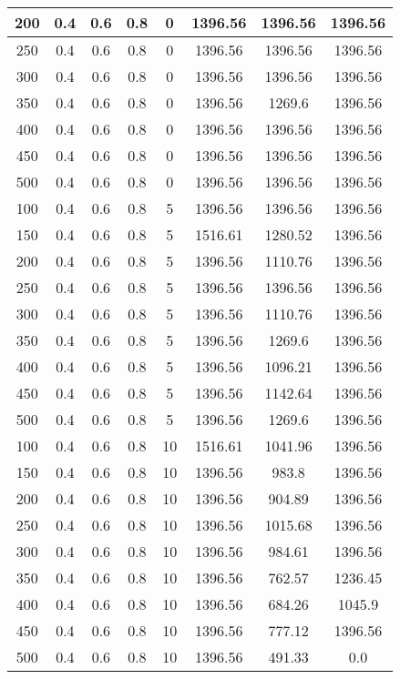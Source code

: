 \documentclass[a4paper, 12pt]{extreport}
\begin{document}
\begin{itemize}
\begin{longtable}{|c|c|c|c|c|c|c|c|}
			200 & 0.4 & 0.6 & 0.8 & 0 & 1396.56 & 1396.56 & 1396.56 \\\hline
			250 & 0.4 & 0.6 & 0.8 & 0 & 1396.56 & 1396.56 & 1396.56 \\\hline
			300 & 0.4 & 0.6 & 0.8 & 0 & 1396.56 & 1396.56 & 1396.56 \\\hline
			350 & 0.4 & 0.6 & 0.8 & 0 & 1396.56 & 1269.6 & 1396.56 \\\hline
			400 & 0.4 & 0.6 & 0.8 & 0 & 1396.56 & 1396.56 & 1396.56 \\\hline
			450 & 0.4 & 0.6 & 0.8 & 0 & 1396.56 & 1396.56 & 1396.56 \\\hline
			500 & 0.4 & 0.6 & 0.8 & 0 & 1396.56 & 1396.56 & 1396.56 \\\hline
			100 & 0.4 & 0.6 & 0.8 & 5 & 1396.56 & 1396.56 & 1396.56 \\\hline
			150 & 0.4 & 0.6 & 0.8 & 5 & 1516.61 & 1280.52 & 1396.56 \\\hline
			200 & 0.4 & 0.6 & 0.8 & 5 & 1396.56 & 1110.76 & 1396.56 \\\hline
			250 & 0.4 & 0.6 & 0.8 & 5 & 1396.56 & 1396.56 & 1396.56 \\\hline
			300 & 0.4 & 0.6 & 0.8 & 5 & 1396.56 & 1110.76 & 1396.56 \\\hline
			350 & 0.4 & 0.6 & 0.8 & 5 & 1396.56 & 1269.6 & 1396.56 \\\hline
			400 & 0.4 & 0.6 & 0.8 & 5 & 1396.56 & 1096.21 & 1396.56 \\\hline
			450 & 0.4 & 0.6 & 0.8 & 5 & 1396.56 & 1142.64 & 1396.56 \\\hline
			500 & 0.4 & 0.6 & 0.8 & 5 & 1396.56 & 1269.6 & 1396.56 \\\hline
			100 & 0.4 & 0.6 & 0.8 & 10 & 1516.61 & 1041.96 & 1396.56 \\\hline
			150 & 0.4 & 0.6 & 0.8 & 10 & 1396.56 & 983.8 & 1396.56 \\\hline
			200 & 0.4 & 0.6 & 0.8 & 10 & 1396.56 & 904.89 & 1396.56 \\\hline
			250 & 0.4 & 0.6 & 0.8 & 10 & 1396.56 & 1015.68 & 1396.56 \\\hline
			300 & 0.4 & 0.6 & 0.8 & 10 & 1396.56 & 984.61 & 1396.56 \\\hline
			350 & 0.4 & 0.6 & 0.8 & 10 & 1396.56 & 762.57 & 1236.45 \\\hline
			400 & 0.4 & 0.6 & 0.8 & 10 & 1396.56 & 684.26 & 1045.9 \\\hline
			450 & 0.4 & 0.6 & 0.8 & 10 & 1396.56 & 777.12 & 1396.56 \\\hline
			500 & 0.4 & 0.6 & 0.8 & 10 & 1396.56 & 491.33 & 0.0 \\\hline

\end{longtable}
\end{itemize}
\end{document}
